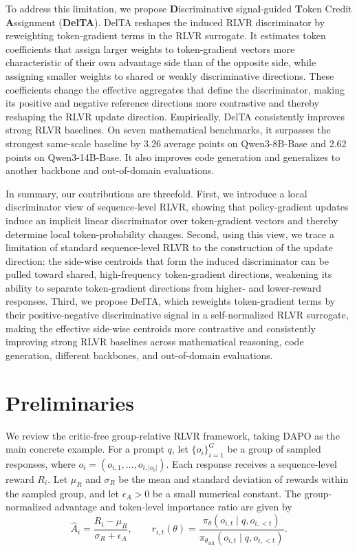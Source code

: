 \documentclass{article} %
\begin{document}
To address this limitation, we propose \textbf{D}iscriminativ\textbf{e} signa\textbf{l}-guided \textbf{T}oken Credit \textbf{A}ssignment (\textbf{DelTA}). 
DelTA reshapes the induced RLVR discriminator by reweighting token-gradient terms in the RLVR surrogate. 
It estimates token coefficients that assign larger weights to token-gradient vectors more characteristic of their own advantage side than of the opposite side, while assigning smaller weights to shared or weakly discriminative directions. 
These coefficients change the effective aggregates that define the discriminator, making its positive and negative reference directions more contrastive and thereby reshaping the RLVR update direction. 
Empirically, DelTA consistently improves strong RLVR baselines. 
On seven mathematical benchmarks, it surpasses the strongest same-scale baseline by 3.26 average points on Qwen3-8B-Base and 2.62 points on Qwen3-14B-Base. 
It also improves code generation and generalizes to another backbone and out-of-domain evaluations.


In summary, our contributions are threefold. First, we introduce a local discriminator view of sequence-level RLVR, showing that policy-gradient updates induce an implicit linear discriminator over token-gradient vectors and thereby determine local token-probability changes. Second, using this view, we trace a limitation of standard sequence-level RLVR to the construction of the update direction: the side-wise centroids that form the induced discriminator can be pulled toward shared, high-frequency token-gradient directions, weakening its ability to separate token-gradient directions from higher- and lower-reward responses. Third, we propose DelTA, which reweights token-gradient terms by their positive-negative discriminative signal in a self-normalized RLVR surrogate, making the effective side-wise centroids more contrastive and consistently improving strong RLVR baselines across mathematical reasoning, code generation, different backbones, and out-of-domain evaluations.

\section{Preliminaries}
\label{sec:prelim}


We review the critic-free group-relative RLVR framework, taking DAPO as the main concrete example. For a prompt \(q\), let \(\{o_i\}_{i=1}^G\) be a group of sampled responses,
where \(o_i=(o_{i,1},\dots,o_{i,|o_i|})\). 
Each response receives a sequence-level reward \(R_i\). 
Let \(\mu_R\) and \(\sigma_R\) be the mean and standard deviation of rewards within the sampled group, and let \(\epsilon_A>0\) be a small numerical constant. 
The group-normalized advantage and token-level importance ratio are given by
\[
\hat A_i
=
\frac{R_i-\mu_R}{\sigma_R+\epsilon_A},
\qquad
r_{i,t}(\theta)
=
\frac{
\pi_\theta(o_{i,t}\mid q,o_{i,<t})
}{
\pi_{\theta_{\mathrm{old}}}(o_{i,t}\mid q,o_{i,<t})
}.
\]
\end{document}
